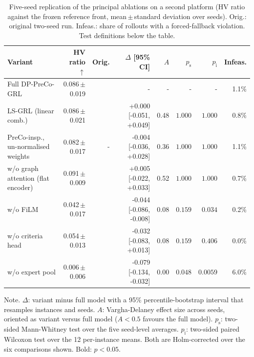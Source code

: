 \begin{table}[htbp]
\centering
\caption{Five-seed replication of the principal ablations on a second platform (HV ratio against the frozen reference front, mean\,$\pm$\,standard deviation over seeds). Orig.: original two-seed run. Infeas.: share of rollouts with a forced-fallback violation. Test definitions below the table.}
\label{tab:ablrep}
\footnotesize
\setlength{\tabcolsep}{4pt}
\begin{tabular}{lrrrrrrr}
\toprule
Variant & HV ratio $\uparrow$ & Orig. & $\Delta$ [95\% CI] & $A$ & $p_{\mathrm{s}}$ & $p_{\mathrm{i}}$ & Infeas. \\
\midrule
Full DP-PreCo-GRL & 0.086\,$\pm$\,0.019 & \ablFull{} & - & - & - & - & 1.1\% \\
LS-GRL (linear comb.) & 0.086\,$\pm$\,0.021 & \ablLs{} & +0.000 [-0.051, +0.049] & 0.48 & $1.000$ & $1.000$ & 0.8\% \\
PreCo-insp., un-normalised weights & 0.082\,$\pm$\,0.017 & - & -0.004 [-0.036, +0.028] & 0.36 & $1.000$ & $1.000$ & 1.1\% \\
w/o graph attention (flat encoder) & 0.091\,$\pm$\,0.009 & \ablNogat{} & +0.005 [-0.022, +0.033] & 0.52 & $1.000$ & $1.000$ & 0.7\% \\
w/o FiLM & 0.042\,$\pm$\,0.017 & \ablNofilm{} & -0.044 [-0.086, -0.008] & 0.08 & $0.159$ & $\mathbf{0.034}$ & 0.2\% \\
w/o criteria head & 0.054\,$\pm$\,0.013 & \ablNocrit{} & -0.032 [-0.083, +0.013] & 0.08 & $0.159$ & $0.406$ & 0.0\% \\
w/o expert pool & 0.006\,$\pm$\,0.006 & \ablNoexpert{} & -0.079 [-0.134, -0.032] & 0.00 & $\mathbf{0.048}$ & $\mathbf{0.0059}$ & 6.0\% \\
\bottomrule
\end{tabular}
\par\smallskip
{\footnotesize Note. $\Delta$: variant minus full model with a 95\% percentile-bootstrap interval that resamples instances and seeds. $A$: Vargha-Delaney effect size across seeds, oriented as variant versus full model ($A<0.5$ favours the full model). $p_{\mathrm{s}}$: two-sided Mann-Whitney test over the five seed-level averages. $p_{\mathrm{i}}$: two-sided paired Wilcoxon test over the 12 per-instance means. Both are Holm-corrected over the six comparisons shown. Bold: $p<0.05$.}
\end{table}
